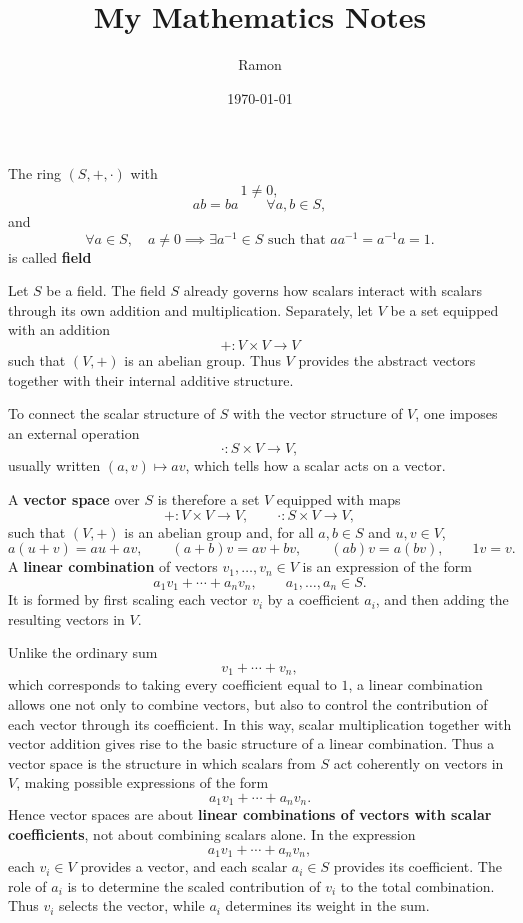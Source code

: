 \documentclass[12pt]{article}
\begin{document}
	
	\title{My Mathematics Notes}
	\author{Ramon}
	\date{\today}
	
	\maketitle
	The ring $(S,+,\cdot)$ with 
	\[
	1 \neq 0,
	\]
	\[
	ab=ba \qquad \forall a,b \in S,
	\]
	and
	\[
	\forall a \in S,\quad a \neq 0 \implies \exists a^{-1} \in S \text{ such that } aa^{-1}=a^{-1}a=1.
	\]
	is called \textbf{field}
	
	Let $S$ be a field. The field $S$ already governs how scalars interact with scalars through its own addition and multiplication. Separately, let $V$ be a set equipped with an addition
	\[
	+ : V\times V \to V
	\]
	such that $(V,+)$ is an abelian group. Thus $V$ provides the abstract vectors together with their internal additive structure.
	
	To connect the scalar structure of $S$ with the vector structure of $V$, one imposes an external operation
	\[
	\cdot : S\times V \to V,
	\]
	usually written $(a,v)\mapsto av$, which tells how a scalar acts on a vector.
	
	A \textbf{vector space} over $S$ is therefore a set $V$ equipped with maps
	\[
	+ : V\times V \to V,
	\qquad
	\cdot : S\times V \to V,
	\]
	such that $(V,+)$ is an abelian group and, for all $a,b\in S$ and $u,v\in V$,
	\[
	a(u+v)=au+av,\qquad (a+b)v=av+bv,\qquad (ab)v=a(bv),\qquad 1v=v.
	\]
	A \textbf{linear combination} of vectors \(v_1,\dots,v_n\in V\) is an expression of the form
	\[
	a_1v_1+\cdots+a_nv_n,
	\qquad a_1,\dots,a_n\in S.
	\]
	It is formed by first scaling each vector \(v_i\) by a coefficient \(a_i\), and then adding the resulting vectors in \(V\).
	
	Unlike the ordinary sum
	\[
	v_1+\cdots+v_n,
	\]
	which corresponds to taking every coefficient equal to \(1\), a linear combination allows one not only to combine vectors, but also to control the contribution of each vector through its coefficient. In this way, scalar multiplication together with vector addition gives rise to the basic structure of a linear combination.
	Thus a vector space is the structure in which scalars from $S$ act coherently on vectors in $V$, making possible expressions of the form
	\[
	a_1v_1+\cdots+a_nv_n.
	\]
	Hence vector spaces are about \textbf{linear combinations of vectors with scalar coefficients}, not about combining scalars alone. In the expression
	\[
	a_1v_1+\cdots+a_nv_n,
	\]
	each $v_i\in V$ provides a vector, and each scalar $a_i\in S$ provides its coefficient. The role of $a_i$ is to determine the scaled contribution of $v_i$ to the total combination. Thus $v_i$ selects the vector, while $a_i$ determines its weight in the sum.
	
\end{document}
